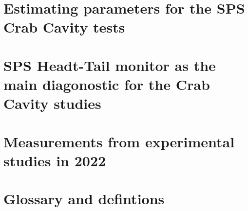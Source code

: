 \documentclass[12pt,twoside]{report} %
\begin{document}
\chapter{Estimating parameters for the SPS Crab Cavity tests}\label{ch:app_C}

\chapter{SPS Headt-Tail monitor as the main diagonostic for the Crab Cavity studies}\label{ch:app_HT_monitor}

\chapter{Measurements from experimental studies in 2022}\label{ch:app_measurments_22}


\chapter{Glossary and defintions}


\backmatter
\printbibliography
{}
\end{document}
